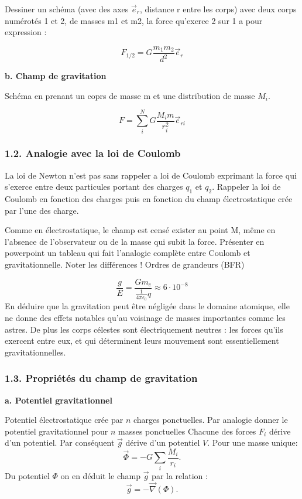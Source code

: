 \documentclass[french, a4paper, 10pt, twocolumn, landscape]{article}
\begin{document}
Dessiner un schéma (avec des axes  $\overrightarrow{e}_r$, distance r entre les corps) avec deux corps numérotés
1 et 2, de masses m1 et m2, la force qu’exerce 2 sur 1 a pour expression :

$$F_{1/2} = G\dfrac{m_1m_2}{d^2}\overrightarrow{e}_r$$

\textbf{b. Champ de gravitation}

Schéma en prenant un coprs de masse m et une distribution de masse $M_i$.

$$F = \sum_{i}^{N}G\dfrac{M_i m}{r_i^2}\overrightarrow{e}_{ri}$$

\subsubsection*{1.2. Analogie avec la loi de Coulomb}

La loi de Newton n’est pas sans rappeler a loi de Coulomb exprimant la force qui s’exerce
entre deux particules portant des charges $q_1$ et $q_2$. Rappeler la loi de Coulomb en fonction des
charges puis en fonction du champ électrostatique crée par l’une des charge.\medskip

Comme en électrostatique, le champ est censé exister au point M, même en
l’absence de l’observateur ou de la masse qui subit la force. Présenter en powerpoint un tableau
qui fait l’analogie complète entre Coulomb et gravitationnelle. Noter les différences ! Ordres de
grandeurs (BFR)\medskip


$$\dfrac{g}{E} = \dfrac{Gm_e}{\frac{1}{4\pi \epsilon_0}q} \approx 6\cdot 10^{-8}$$
En déduire que la gravitation peut être négligée dans le domaine atomique, elle ne donne
des effets notables qu’au voisinage de masses importantes comme les astres. De plus les corps
célestes sont électriquement neutres : les forces qu’ils exercent entre eux, et qui déterminent
leurs mouvement sont essentiellement gravitationnelles.



\subsubsection*{1.3. Propriétés du champ de gravitation}

\textbf{a. Potentiel gravitationnel}

Potentiel électrostatique crée par $n$ charges ponctuelles. Par analogie donner le potentiel gravitationnel pour $n$ masses ponctuelles
Chacune des forces $F_i$ dérive d'un potentiel. Par conséquent $\vec{g}$ dérive d'un potentiel $V$. Pour une masse unique:
\begin{equation}
  \vec{\Phi} = -G\sum_{i}{\dfrac{M_i}{r_i}}.
\end{equation}
Du potentiel $\Phi$ on en déduit le champ $\vec{g}$ par la relation : 
\begin{equation}
  \vec{g} = -\vec{\nabla}(\Phi).
\end{equation}
\end{document}
